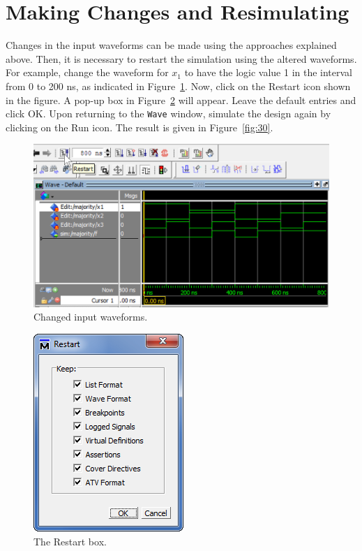 \documentclass[11pt, twoside, pdftex]{article}
\begin{document}
\section{Making Changes and Resimulating}

Changes in the input waveforms can be made using the approaches explained above. Then, it
is necessary to restart the simulation using the altered waveforms. For example, change the
waveform for $x_1$ to have the logic value 1 in the interval from 0 to 200 ns, as indicated
in Figure~\ref{fig:28}. Now, click on the {\sf Restart} icon shown in the figure. A pop-up box in
Figure~\ref{fig:29} will appear. Leave the default entries and click {\sf OK}. Upon returning to the
\texttt{Wave} window, simulate the design again by clicking on the {\sf Run} icon. 
The result is given in Figure~\ref{fig:30}.

\begin{figure}[H]
   \begin{center}
      \includegraphics[scale=0.75]{figures/figure28.png}
   \caption{Changed input waveforms.} 
	 \label{fig:28}
	 \end{center}
\end{figure}

\begin{figure}[H]
   \begin{center}
      \includegraphics[scale=0.8]{figures/figure29.png}
   \caption{The Restart box.} 
	 \label{fig:29}
	 \end{center}
\end{figure}
\end{document}
